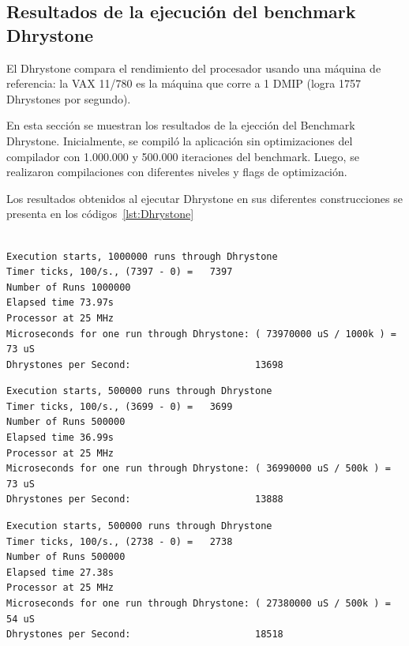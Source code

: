 \newpage

		\subsection{Resultados de la ejecución del benchmark Dhrystone}
El Dhrystone compara el rendimiento del procesador usando una máquina de referencia: la VAX 11/780 es la máquina que corre a 1 DMIP (logra 1757 Dhrystones por segundo).

En esta sección se muestran los resultados de la ejección del Benchmark Dhrystone. Inicialmente, se compiló la aplicación sin optimizaciones del compilador con 1.000.000 y 500.000 iteraciones del benchmark. Luego, se realizaron compilaciones con diferentes niveles y flags de optimización. 

Los resultados obtenidos al ejecutar Dhrystone en sus diferentes construcciones se presenta en los códigos~\ref{lst:Dhrystone}

\begin{lstlisting}[frame=single,caption={Sin optimizaciones },label={lst:Dhrystone},breaklines]

Execution starts, 1000000 runs through Dhrystone
Timer ticks, 100/s., (7397 - 0) =	7397
Number of Runs 1000000
Elapsed time 73.97s
Processor at 25 MHz
Microseconds for one run through Dhrystone: ( 73970000 uS / 1000k ) = 73 uS
Dhrystones per Second:                      13698 
\end{lstlisting}

\begin{lstlisting}[frame=single,caption={Optimización nivel -O2},label={lst:salidas},breaklines]
Execution starts, 500000 runs through Dhrystone
Timer ticks, 100/s., (3699 - 0) =	3699
Number of Runs 500000
Elapsed time 36.99s
Processor at 25 MHz
Microseconds for one run through Dhrystone: ( 36990000 uS / 500k ) = 73 uS
Dhrystones per Second:                      13888 
\end{lstlisting}

\begin{lstlisting}[frame=single,caption={Optimización nivel -O3},label={lst:salidas},breaklines]
Execution starts, 500000 runs through Dhrystone
Timer ticks, 100/s., (2738 - 0) =	2738
Number of Runs 500000
Elapsed time 27.38s
Processor at 25 MHz
Microseconds for one run through Dhrystone: ( 27380000 uS / 500k ) = 54 uS
Dhrystones per Second:                      18518 
\end{lstlisting}


